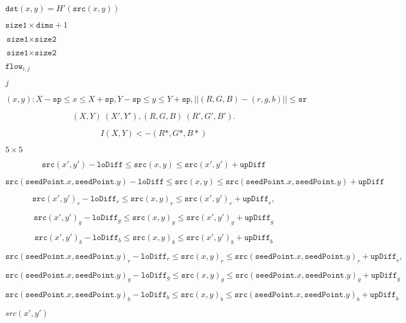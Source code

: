 \documentclass{article}
\begin{document}
$\texttt{dst}(x,y) = H'(\texttt{src}(x,y))$
\pagebreak

$\texttt{size1}\times \texttt{dims}+1$
\pagebreak

$\texttt{size1}\times \texttt{size2}$
\pagebreak

$\texttt{size1} \times \texttt{size2}$
\pagebreak

$\texttt{flow}_{i,j}$
\pagebreak

$j$
\pagebreak

\[(x,y): X- \texttt{sp} \le x \le X+ \texttt{sp} , Y- \texttt{sp} \le y \le Y+ \texttt{sp} , ||(R,G,B)-(r,g,b)|| \le \texttt{sr}\]
\pagebreak

\[(X,Y)~(X',Y'), (R,G,B)~(R',G',B').\]
\pagebreak

\[I(X,Y) <- (R*,G*,B*)\]
\pagebreak

$5\times 5$
\pagebreak

\[\texttt{src} (x',y')- \texttt{loDiff} \leq \texttt{src} (x,y) \leq \texttt{src} (x',y')+ \texttt{upDiff}\]
\pagebreak

\[\texttt{src} ( \texttt{seedPoint} .x, \texttt{seedPoint} .y)- \texttt{loDiff} \leq \texttt{src} (x,y) \leq \texttt{src} ( \texttt{seedPoint} .x, \texttt{seedPoint} .y)+ \texttt{upDiff}\]
\pagebreak

\[\texttt{src} (x',y')_r- \texttt{loDiff} _r \leq \texttt{src} (x,y)_r \leq \texttt{src} (x',y')_r+ \texttt{upDiff} _r,\]
\pagebreak

\[\texttt{src} (x',y')_g- \texttt{loDiff} _g \leq \texttt{src} (x,y)_g \leq \texttt{src} (x',y')_g+ \texttt{upDiff} _g\]
\pagebreak

\[\texttt{src} (x',y')_b- \texttt{loDiff} _b \leq \texttt{src} (x,y)_b \leq \texttt{src} (x',y')_b+ \texttt{upDiff} _b\]
\pagebreak

\[\texttt{src} ( \texttt{seedPoint} .x, \texttt{seedPoint} .y)_r- \texttt{loDiff} _r \leq \texttt{src} (x,y)_r \leq \texttt{src} ( \texttt{seedPoint} .x, \texttt{seedPoint} .y)_r+ \texttt{upDiff} _r,\]
\pagebreak

\[\texttt{src} ( \texttt{seedPoint} .x, \texttt{seedPoint} .y)_g- \texttt{loDiff} _g \leq \texttt{src} (x,y)_g \leq \texttt{src} ( \texttt{seedPoint} .x, \texttt{seedPoint} .y)_g+ \texttt{upDiff} _g\]
\pagebreak

\[\texttt{src} ( \texttt{seedPoint} .x, \texttt{seedPoint} .y)_b- \texttt{loDiff} _b \leq \texttt{src} (x,y)_b \leq \texttt{src} ( \texttt{seedPoint} .x, \texttt{seedPoint} .y)_b+ \texttt{upDiff} _b\]
\pagebreak

$src(x',y')$
\pagebreak
\end{document}
